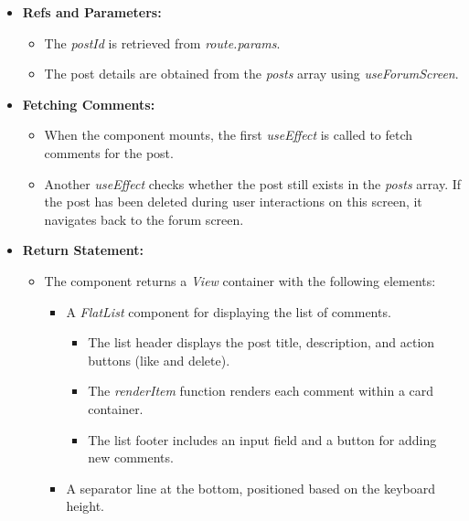 \begin{itemize}
    \item \textbf{Refs and Parameters:}
    \begin{itemize}
        \item The \textit{postId} is retrieved from \textit{route.params}.
        \item The post details are obtained from the \textit{posts} array using \textit{useForumScreen}.
    \end{itemize}

    \item \textbf{Fetching Comments:}
    \begin{itemize}
        \item When the component mounts, the first \textit{useEffect} is called to fetch comments for the post.
        \item Another \textit{useEffect} checks whether the post still exists in the \textit{posts} array. If the post has been deleted during user interactions on this screen, it navigates back to the forum screen.
    \end{itemize}

    \item \textbf{Return Statement:}
    \begin{itemize}
        \item The component returns a \textit{View} container with the following elements:
        \begin{itemize}
            \item A \textit{FlatList} component for displaying the list of comments.
            \begin{itemize}
                \item The list header displays the post title, description, and action buttons (like and delete).
                \item The \textit{renderItem} function renders each comment within a card container.
                \item The list footer includes an input field and a button for adding new comments.
            \end{itemize}
            \item A separator line at the bottom, positioned based on the keyboard height.
        \end{itemize}
    \end{itemize}
\end{itemize}

